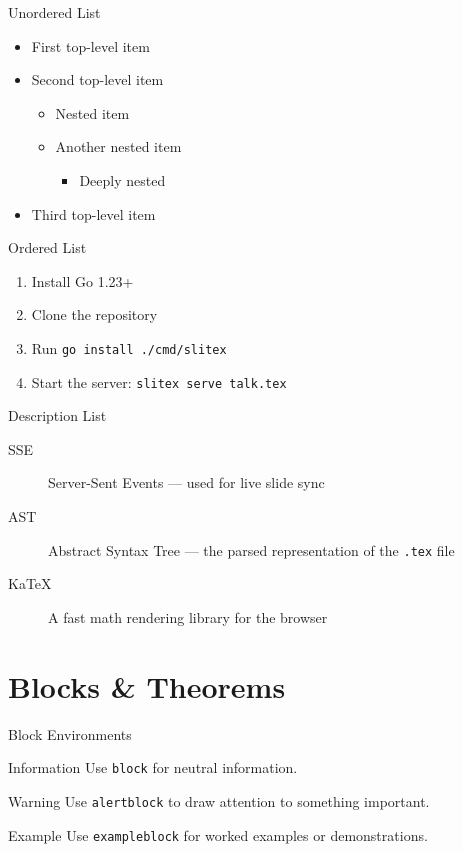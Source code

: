 \documentclass[aspectratio=169]{beamer}
\begin{document}
\begin{frame}{Unordered List}
  \begin{itemize}
    \item First top-level item
    \item Second top-level item
      \begin{itemize}
        \item Nested item
        \item Another nested item
          \begin{itemize}
            \item Deeply nested
          \end{itemize}
      \end{itemize}
    \item Third top-level item
  \end{itemize}
\end{frame}

\begin{frame}{Ordered List}
  \begin{enumerate}
    \item Install Go 1.23+
    \item Clone the repository
    \item Run \texttt{go install ./cmd/slitex}
    \item Start the server: \texttt{slitex serve talk.tex}
  \end{enumerate}
\end{frame}

\begin{frame}{Description List}
  \begin{description}
    \item[SSE] Server-Sent Events — used for live slide sync
    \item[AST] Abstract Syntax Tree — the parsed representation of the \texttt{.tex} file
    \item[KaTeX] A fast math rendering library for the browser
  \end{description}
\end{frame}

\section{Blocks \& Theorems}

\begin{frame}{Block Environments}
  \begin{block}{Information}
    Use \texttt{block} for neutral information.
  \end{block}

  \begin{alertblock}{Warning}
    Use \texttt{alertblock} to draw attention to something important.
  \end{alertblock}

  \begin{exampleblock}{Example}
    Use \texttt{exampleblock} for worked examples or demonstrations.
  \end{exampleblock}
\end{frame}
\end{document}
